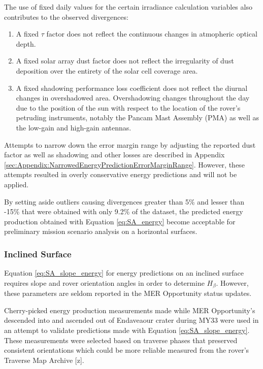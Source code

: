 
The use of fixed daily values for the certain irradiance calculation variables also contributes to the observed divergences:

\begin{enumerate}[label=\textbf{\textcolor{BulletBlue}{(\alph*)}}]
  \item A fixed $\tau$ factor does not reflect the continuous changes in atmopheric optical depth.
  \item A fixed solar array dust factor does not reflect the irregularity of dust deposition over the entirety of the solar cell coverage area.
  \item A fixed shadowing performance loss coefficient does not reflect the diurnal changes in overshadowed area. Overshadowing changes throughout the day due to the position of the sun with respect to the location of the rover's petruding instruments, notably the Pancam Mast Assembly (PMA) as well as the low-gain and high-gain antennas.
\end{enumerate}

Attempts to narrow down the error margin range by adjusting the reported dust factor as well as shadowing and other losses are described in Appendix \ref{sec:Appendix:NarrowedEnergyPredictionErrorMarginRange}. However, these attempts resulted in overly conservative energy predictions and will not be applied.

By setting aside outliers causing divergences greater than 5\% and lesser than -15\% that were obtained with only 9.2\% of the dataset, the predicted energy production obtained with Equation \ref{eq:SA_energy} become acceptable for preliminary mission scenario analysis on a horizontal surfaces.

\subsubsection{Inclined Surface}
\label{sec:PowerAndEnergyPredictions:Validation:InclinedSurface}

Equation \ref{eq:SA_slope_energy} for energy predictions on an inclined surface requires slope and rover orientation angles in order to determine $H_{\beta}$. However, these parameters are seldom reported in the \ac{MER} Opportunity status updates.

Cherry-picked energy production measurements made while \ac{MER} Opportunity's descended into and ascended out of Endaveaour crater during MY33 were used in an attempt to validate predictions made with Equation \ref{eq:SA_slope_energy}. These measurements were selected based on traverse phases that preserved consistent orientations which could be more reliable measured from the rover's Traverse Map Archive [z].

